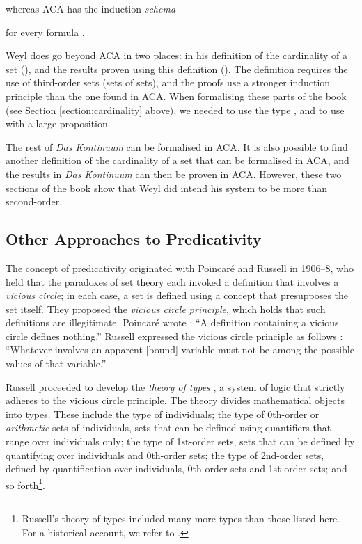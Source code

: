 \documentclass[acmtocl]{acmtrans2m}
\begin{document}
whereas ACA has the induction \emph{schema}

for every formula .

Weyl does go beyond ACA in two places: in his definition of the cardinality of a set (\cite[Chapter 1 \S 7, pp. 38--39]{weyl:continuum}), and the results proven using this definition (\cite[Chapter 2 \S 1, pp.55f]{weyl:continuum}).  The definition requires the use of third-order sets (sets of sets), and the proofs use a stronger induction principle than the one found in ACA.  When formalising these parts of the book (see Section \ref{section:cardinality} above), we needed to use the type , and to use  with a large proposition.

\pagebreak

The rest of \emph{Das Kontinuum} can be formalised in ACA.  It is also possible to find another definition of the cardinality of a set that can be formalised in ACA, and the results in \emph{Das Kontinuum} can then be proven in ACA.  However, these two sections of the book show that Weyl did intend his system to be more than second-order.

\subsection{Other Approaches to Predicativity}




The concept of predicativity originated with Poincar\'e and Russell in 1906--8, who
held that the paradoxes of set theory each invoked a definition that involves a \emph{vicious circle}; in each case, a set  is defined using a concept that presupposes the set  itself.  They proposed the \emph{vicious circle principle}, which holds that such definitions are illegitimate.  Poincar\'e wrote \cite{poincare:ml3}: ``A definition containing a vicious circle defines nothing.''  Russell expressed the vicious circle principle as follows \cite{russell:pl}: ``Whatever involves an apparent [bound] variable must not be among the possible values of that variable.''

Russell proceeded to develop the \emph{theory of types} \cite{russell:mlbtt}, a system of logic that strictly adheres to the vicious circle principle.  The theory divides mathematical objects into types.  These include the type of individuals; the type of 0th-order or \emph{arithmetic} sets of individuals, sets that can be defined using quantifiers that range over individuals only; the type of 1st-order sets, sets that can be defined by quantifying over individuals and 0th-order sets; the type of 2nd-order sets, defined by quantification over individuals, 0th-order sets and 1st-order sets; and so forth\footnote{Russell's theory of types included many more types than those listed here.  For a historical account, we refer to \cite{kln:tlm1940}.}.
\end{document}

